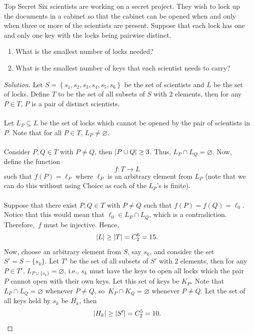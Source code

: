 \documentclass[math]{amznotes}
\theoremstyle{remark}
\newcommand{\0}{\mathbf{0}}
\newcommand{\1}{\mathbf{1}}
\newenvironment{solution}
    {\let\oldqedsymbol=\qedsymbol
    \renewcommand{\qedsymbol}{\ }
    \begin{proof}[Solution]
    }
    {\end{proof}
    \renewcommand{\qedsymbol}{\oldqedsymbol}
    }
\begin{document}
\begin{exbox}{Top Secret}{}
    Six scientists are working on a secret project. They wish to lock up the documents in a cabinet so that the cabinet can be opened when and only when three or more of the scientists are present. Suppose that each lock has one and only one key with the locks being pairwise distinct.
    \begin{enumerate}
        \item What is the smallest number of locks needed?
        \item What is the smallest number of keys that each scientist needs to carry?
    \end{enumerate}
    \tcblower   
    \begin{solution}
        Let $S = \left\{s_1, s_2, s_3, s_4, s_5, s_6\right\}$ be the set of scientists and $L$ be the set of locks. Define $T$ to be the set of all subsets of $S$ with $2$ elements, then for any $P \in T$, $P$ is a pair of distinct scientists.
        \\\\
        Let $L_P \subseteq L$ be the set of locks which cannot be opened by the pair of scientists in $P$. Note that for all $P \in T$, $L_P \neq \varnothing$. 
        \\\\
        Consider $P, Q \in T$ with $P \neq Q$, then ${\left\lvert {P \cup Q} \right\rvert} \geq 3$. Thus, $L_P \cap L_Q = \varnothing$. Now, define the function
        \begin{displaymath}
            f \colon T \to L
        \end{displaymath}
        such that $f(P) = \ell_P$ where $\ell_P$ is an arbitrary element from $L_P$ (note that we can do this without using Choice as each of the $L_P$'s is finite).
        \\\\
        Suppose that there exist $P, Q \in T$ with $P \neq Q$ such that $f(P) = f(Q) = \ell_0$. Notice that this would mean that $\ell_0 \in L_P \cap L_Q$, which is a contradiction. Therefore,~$f$ must be injective. Hence, 
        \begin{equation*}
            {\left\lvert {L} \right\rvert} \geq {\left\lvert {T} \right\rvert} = C^6_2 = 15.
        \end{equation*}
        Now, choose an arbitrary element from $S$, say $s_k$, and consider the set $S' = S - \{s_k\}$. Let $T'$ be the set of all subsets of $S'$ with $2$ elements, then for any $P \in T'$, $L_{P \cup \{s_k\}} = \varnothing$, i.e., $s_k$ must have the keys to open all locks which the pair $P$ cannot open with their own keys. Let this set of keys be $K_P$. Note that $L_P \cap L_Q = \varnothing$ whenever $P \neq Q$, so~$K_P \cap K_Q = \varnothing$ whenever $P \neq Q$. Let the set of all keys held by $s_k$ be $H_k$, then
        \begin{equation*}
            {\left\lvert {H_k} \right\rvert} \geq {\left\lvert {S'} \right\rvert} = C^5_2 = 10.
        \end{equation*}
    \end{solution}
\end{exbox}
\end{document}
